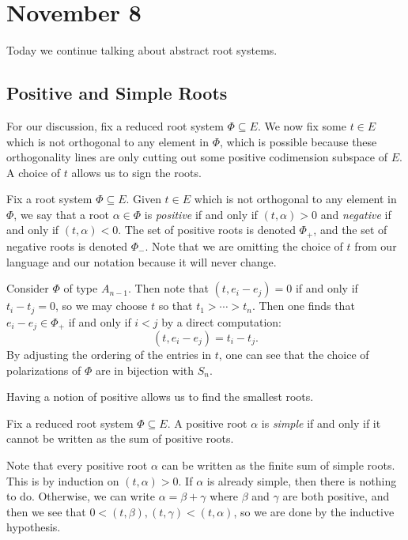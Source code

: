 \documentclass[../notes.tex]{subfiles}
\begin{document}
\section{November 8}
Today we continue talking about abstract root systems.

\subsection{Positive and Simple Roots}
For our discussion, fix a reduced root system $\Phi\subseteq E$. We now fix some $t\in E$ which is not orthogonal to any element in $\Phi$, which is possible because these orthogonality lines are only cutting out some positive codimension subspace of $E$. A choice of $t$ allows us to sign the roots.
\begin{definition}[positive]
	Fix a root system $\Phi\subseteq E$. Given $t\in E$ which is not orthogonal to any element in $\Phi$, we say that a root $\alpha\in\Phi$ is \textit{positive} if and only if $(t,\alpha)>0$ and \textit{negative} if and only if $(t,\alpha)<0$. The set of positive roots is denoted $\Phi_+$, and the set of negative roots is denoted $\Phi_-$. Note that we are omitting the choice of $t$ from our language and our notation because it will never change.
\end{definition}
\begin{example}
	Consider $\Phi$ of type $A_{n-1}$. Then note that $(t,e_i-e_j)=0$ if and only if $t_i-t_j=0$, so we may choose $t$ so that $t_1>\cdots>t_n$. Then one finds that $e_i-e_j\in\Phi_+$ if and only if $i<j$ by a direct computation:
	\[(t,e_i-e_j)=t_i-t_j.\]
	By adjusting the ordering of the entries in $t$, one can see that the choice of polarizations of $\Phi$ are in bijection with $S_n$.
\end{example}
Having a notion of positive allows us to find the smallest roots.
\begin{definition}[simple]
	Fix a reduced root system $\Phi\subseteq E$. A positive root $\alpha$ is \textit{simple} if and only if it cannot be written as the sum of positive roots.
\end{definition}
\begin{remark}
	Note that every positive root $\alpha$ can be written as the finite sum of simple roots. This is by induction on $(t,\alpha)>0$. If $\alpha$ is already simple, then there is nothing to do. Otherwise, we can write $\alpha=\beta+\gamma$ where $\beta$ and $\gamma$ are both positive, and then we see that $0<(t,\beta),(t,\gamma)<(t,\alpha)$, so we are done by the inductive hypothesis.
\end{remark}
\end{document}
